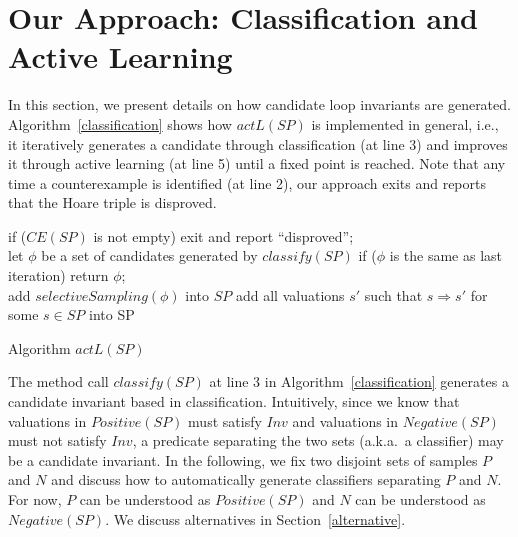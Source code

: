 \section{Our Approach: Classification and Active Learning}
\label{sec:classifierlearning}
In this section, we present details on how candidate loop invariants are generated. Algorithm~\ref{classification} shows how $actL(SP)$ is implemented in general, i.e., it iteratively generates a candidate through classification (at line 3) and improves it through active learning (at line 5) until a fixed point is reached. Note that any time a counterexample is identified (at line 2), our approach exits and reports that the Hoare triple is disproved.

\begin{algorithm}[t]
\SetAlgoVlined
\Indm
\Indp
{} {
    if ($CE(SP)$ is not empty) { exit and report ``disproved''; } \\
    let $\phi$ be a set of candidates generated by $classify(SP)$\;
    if ($\phi$ is the same as last iteration){ return $\phi$; } \\
    add $selectiveSampling(\phi)$ into $SP$\;
    add all valuations $s'$ such that $s \Rightarrow s'$ for some $s \in SP$ into SP\;
}
\caption{Algorithm $actL(SP)$}
\label{classification}
\end{algorithm}

The method call $classify(SP)$ at line 3 in Algorithm~\ref{classification} generates a candidate invariant based in classification. Intuitively, since we know that valuations in $Positive(SP)$ must satisfy $Inv$ and valuations in $Negative(SP)$ must not satisfy $Inv$, a predicate separating the two sets (a.k.a.~a classifier) may be a candidate invariant. In the following, we fix two disjoint sets of samples $P$ and $N$ and discuss how to automatically generate classifiers separating $P$ and $N$. For now, $P$ can be understood as $Positive(SP)$ and $N$ can be understood as $Negative(SP)$. We discuss alternatives in Section~\ref{alternative}.

